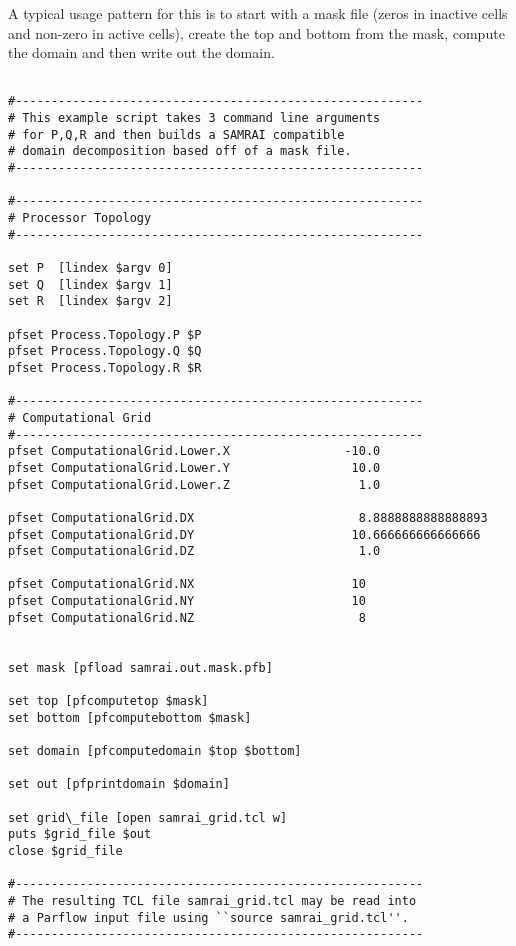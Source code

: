 \begin{description}
A typical usage pattern for this is to start with a mask file (zeros
 in inactive cells and non-zero in active cells), create the top and
 bottom from the mask, compute the domain and then write out the domain.


\begin{verbatim}

#---------------------------------------------------------
# This example script takes 3 command line arguments
# for P,Q,R and then builds a SAMRAI compatible 
# domain decomposition based off of a mask file.
#---------------------------------------------------------

#---------------------------------------------------------
# Processor Topology
#---------------------------------------------------------

set P  [lindex $argv 0]
set Q  [lindex $argv 1]
set R  [lindex $argv 2]

pfset Process.Topology.P $P
pfset Process.Topology.Q $Q   
pfset Process.Topology.R $R

#---------------------------------------------------------
# Computational Grid
#---------------------------------------------------------
pfset ComputationalGrid.Lower.X                -10.0
pfset ComputationalGrid.Lower.Y                 10.0
pfset ComputationalGrid.Lower.Z                  1.0

pfset ComputationalGrid.DX                       8.8888888888888893
pfset ComputationalGrid.DY                      10.666666666666666
pfset ComputationalGrid.DZ                       1.0

pfset ComputationalGrid.NX                      10
pfset ComputationalGrid.NY                      10
pfset ComputationalGrid.NZ                       8


set mask [pfload samrai.out.mask.pfb]

set top [pfcomputetop $mask]
set bottom [pfcomputebottom $mask]

set domain [pfcomputedomain $top $bottom]

set out [pfprintdomain $domain]

set grid\_file [open samrai_grid.tcl w]
puts $grid_file $out
close $grid_file

#---------------------------------------------------------
# The resulting TCL file samrai_grid.tcl may be read into
# a Parflow input file using ``source samrai_grid.tcl''.
#---------------------------------------------------------
\end{verbatim}


\end{description}
